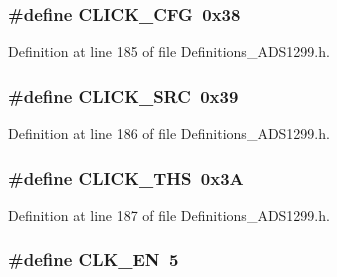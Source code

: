 \subsubsection[{\texorpdfstring{C\+L\+I\+C\+K\+\_\+\+C\+FG}{CLICK_CFG}}]{\setlength{\rightskip}{0pt plus 5cm}\#define C\+L\+I\+C\+K\+\_\+\+C\+FG~0x38}\hypertarget{group__Definitions__ADS1299_ga72296c7a2c62252b65b70c387f3de322}{}\label{group__Definitions__ADS1299_ga72296c7a2c62252b65b70c387f3de322}


Definition at line 185 of file Definitions\+\_\+\+A\+D\+S1299.\+h.

\subsubsection[{\texorpdfstring{C\+L\+I\+C\+K\+\_\+\+S\+RC}{CLICK_SRC}}]{\setlength{\rightskip}{0pt plus 5cm}\#define C\+L\+I\+C\+K\+\_\+\+S\+RC~0x39}\hypertarget{group__Definitions__ADS1299_ga709f34da66755c684de2b3d58de46515}{}\label{group__Definitions__ADS1299_ga709f34da66755c684de2b3d58de46515}


Definition at line 186 of file Definitions\+\_\+\+A\+D\+S1299.\+h.

\subsubsection[{\texorpdfstring{C\+L\+I\+C\+K\+\_\+\+T\+HS}{CLICK_THS}}]{\setlength{\rightskip}{0pt plus 5cm}\#define C\+L\+I\+C\+K\+\_\+\+T\+HS~0x3A}\hypertarget{group__Definitions__ADS1299_gaec7367f2c97c08cd2320937a7c4bcd44}{}\label{group__Definitions__ADS1299_gaec7367f2c97c08cd2320937a7c4bcd44}


Definition at line 187 of file Definitions\+\_\+\+A\+D\+S1299.\+h.

\subsubsection[{\texorpdfstring{C\+L\+K\+\_\+\+EN}{CLK_EN}}]{\setlength{\rightskip}{0pt plus 5cm}\#define C\+L\+K\+\_\+\+EN~5}\hypertarget{group__Definitions__ADS1299_ga9303a043ca7b266ef138d3d55838cd65}{}\label{group__Definitions__ADS1299_ga9303a043ca7b266ef138d3d55838cd65}


